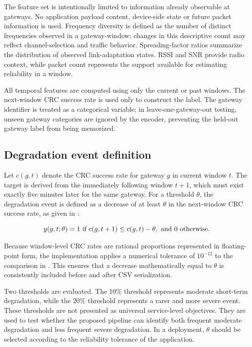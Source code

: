 \documentclass{jot}
\begin{document}
The feature set is intentionally limited to information already observable at gateways. No application payload content, device-side state or future packet information is used. Frequency diversity is defined as the number of distinct frequencies observed in a gateway-window; changes in this descriptive count may reflect channel-selection and traffic behavior. Spreading-factor ratios summarize the distribution of observed link-adaptation states. RSSI and SNR provide radio context, while packet count represents the support available for estimating reliability in a window.

All temporal features are computed using only the current or past windows. The next-window CRC success rate is used only to construct the label. The gateway identifier is treated as a categorical variable; in leave-one-gateway-out testing, unseen gateway categories are ignored by the encoder, preventing the held-out gateway label from being memorized.

\subsection{Degradation event definition}\label{s:3.3}
Let $c(g,t)$ denote the CRC success rate for gateway $g$ in current window $t$. The target is derived from the immediately following window $t+1$, which must exist exactly five minutes later for the same gateway. For a threshold $\theta$, the degradation event is defined as a decrease of at least $\theta$ in the next-window CRC success rate, as given in :

\begin{equation}\elabel{e1}
y(g,t;\theta) = 1 \ \text{if}\ c(g,t+1) \le c(g,t) - \theta,\ \text{and}\ 0\ \text{otherwise.}
\end{equation}

Because window-level CRC rates are rational proportions represented in floating-point form, the implementation applies a numerical tolerance of $10^{-12}$ to the comparison in . This ensures that a decrease mathematically equal to $\theta$ is consistently included before and after CSV serialization.

Two thresholds are evaluated. The 10\% threshold represents moderate short-term degradation, while the 20\% threshold represents a rarer and more severe event. These thresholds are not presented as universal service-level objectives. They are used to test whether the proposed pipeline can identify both frequent moderate degradation and less frequent severe degradation. In a deployment, $\theta$ should be selected according to the reliability tolerance of the application.
\end{document}
